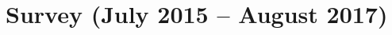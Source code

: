 \documentclass[a4paper,fleqn,usenatbib]{mnras}
\begin{document}
%

\section{Survey (July 2015 -- August 2017)}
\label{sec:overview}
\end{document}
